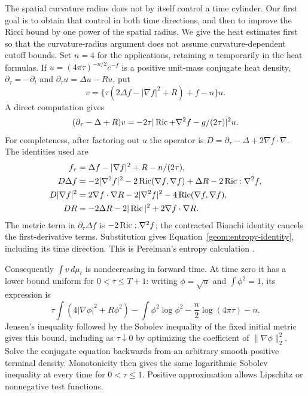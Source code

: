 The spatial curvature radius does not by itself control a time cylinder.
Our first goal is to obtain that control in both time directions, and
then to improve the Ricci bound by one power of the spatial radius.
We give the heat estimates first so that the curvature-radius argument
does not assume curvature-dependent cutoff bounds. Set $n=4$ for the
applications, retaining $n$ temporarily in the heat formulas. If
$u=(4\pi\tau)^{-n/2}e^{-f}$ is a positive unit-mass conjugate heat
density, $\partial_\tau=-\partial_t$ and
$\partial_\tau u=\Delta u-Ru$, put
\[
 v=\{\tau(2\Delta f-|\nabla f|^2+R)+f-n\}u.
\]
A direct computation gives
\begin{equation}\label{geom:entropy-identity}
 (\partial_\tau-\Delta+R)v
 =-2\tau|\operatorname{Ric}+\nabla^2f-g/(2\tau)|^2u.
\end{equation}
For completeness, after factoring out $u$ the operator is
$D=\partial_\tau-\Delta+2\nabla f\cdot\nabla$. The identities used are
\begin{align*}
 f_\tau&=\Delta f-|\nabla f|^2+R-n/(2\tau),\\
 D\Delta f&=-2|\nabla^2 f|^2-2\operatorname{Ric}(\nabla f,\nabla f)
                  +\Delta R-2\operatorname{Ric}:\nabla^2f,\\
 D|\nabla f|^2&=2\nabla f\cdot\nabla R
                   -2|\nabla^2 f|^2-4\operatorname{Ric}(\nabla f,\nabla f),\\
 DR&=-2\Delta R-2|\operatorname{Ric}|^2+2\nabla f\cdot\nabla R.
\end{align*}
The metric term in $\partial_\tau\Delta f$ is
$-2\operatorname{Ric}:\nabla^2f$; the contracted Bianchi identity cancels the
first-derivative terms. Substitution gives
Equation~\eqref{geom:entropy-identity}, including its time direction.
This is Perelman's entropy calculation
\cite[Proposition~9.1]{PerelmanEntropy}.

Consequently $\int v\,d\mu_t$ is nondecreasing in forward time.
At time zero it has a lower bound uniform for $0<\tau\leq T+1$:
writing $\phi=\sqrt u$ and $\int\phi^2=1$, its expression is
\[
 \tau\int(4|\nabla\phi|^2+R\phi^2)
 -\int\phi^2\log\phi^2-\frac n2\log(4\pi\tau)-n.
\]
Jensen's inequality followed by the Sobolev inequality of the fixed
initial metric gives this bound, including as $\tau\downarrow0$ by
optimizing the coefficient of $\|\nabla\phi\|_2^2$. Solve the
conjugate equation backwards from an arbitrary smooth positive
terminal density. Monotonicity then gives the same logarithmic Sobolev
inequality at every time for $0<\tau\leq1$. Positive approximation
allows Lipschitz or nonnegative test functions.

